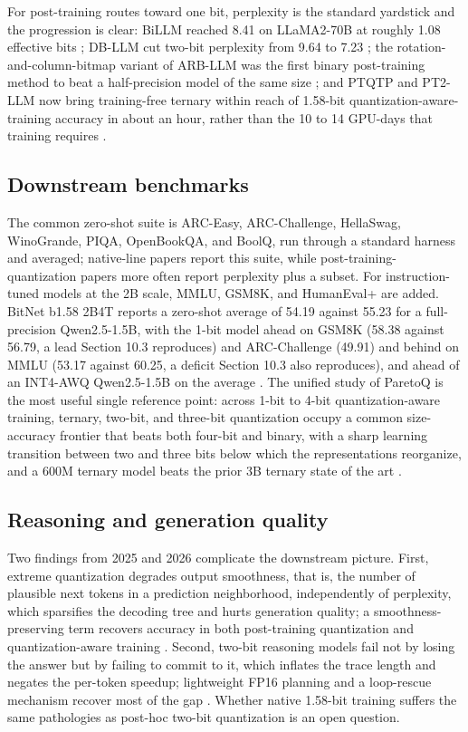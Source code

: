 \documentclass[11pt]{article}
\begin{document}
For post-training routes toward one bit, perplexity is the standard yardstick and the
progression is clear: BiLLM reached 8.41 on LLaMA2-70B at roughly 1.08 effective bits
\cite{Huang2024-BiLLM}; DB-LLM cut two-bit perplexity from 9.64 to 7.23 \cite{Chen2024-DBLLM}; the
rotation-and-column-bitmap variant of ARB-LLM was the first binary post-training method
to beat a half-precision model of the same size \cite{Li2024-ARBLLM}; and PTQTP and PT2-LLM
now bring training-free ternary within reach of 1.58-bit quantization-aware-training
accuracy in about an hour, rather than the 10 to 14 GPU-days that training requires
\cite{Xiao2025-PTQTP,Yan2025-PT2LLM}.

\subsection{Downstream benchmarks}

The common zero-shot suite is ARC-Easy, ARC-Challenge, HellaSwag, WinoGrande, PIQA,
OpenBookQA, and BoolQ, run through a standard harness and averaged; native-line papers
report this suite, while post-training-quantization papers more often report perplexity
plus a subset. For instruction-tuned models at the 2B scale, MMLU, GSM8K, and
HumanEval+ are added. BitNet b1.58 2B4T reports a zero-shot average of 54.19 against
55.23 for a full-precision Qwen2.5-1.5B, with the 1-bit model ahead on GSM8K
(58.38 against 56.79, a lead Section 10.3 reproduces) and ARC-Challenge (49.91) and behind
on MMLU (53.17 against 60.25, a deficit Section 10.3 also reproduces), and ahead of an
INT4-AWQ Qwen2.5-1.5B on the average \cite{Ma2025-BitNet2B4T}. The
unified study of ParetoQ is the most useful single reference point: across 1-bit to
4-bit quantization-aware training, ternary, two-bit, and three-bit quantization occupy a
common size-accuracy frontier that beats both four-bit and binary, with a sharp
learning transition between two and three bits below which the representations
reorganize, and a 600M ternary model beats the prior 3B ternary state of the art
\cite{Liu2025-ParetoQ}.

\subsection{Reasoning and generation quality}

Two findings from 2025 and 2026 complicate the downstream picture. First, extreme
quantization degrades output smoothness, that is, the number of plausible next tokens in
a prediction neighborhood, independently of perplexity, which sparsifies the decoding
tree and hurts generation quality; a smoothness-preserving term recovers accuracy in
both post-training quantization and quantization-aware training
\cite{Xu2026-FittingNotEnough}. Second, two-bit reasoning models fail not by losing the
answer but by failing to commit to it, which inflates the trace length and negates the
per-token speedup; lightweight FP16 planning and a loop-rescue mechanism recover most of
the gap \cite{Alimaskina2026-ExtremeReasoning}. Whether native 1.58-bit training suffers the
same pathologies as post-hoc two-bit quantization is an open question.
\end{document}
